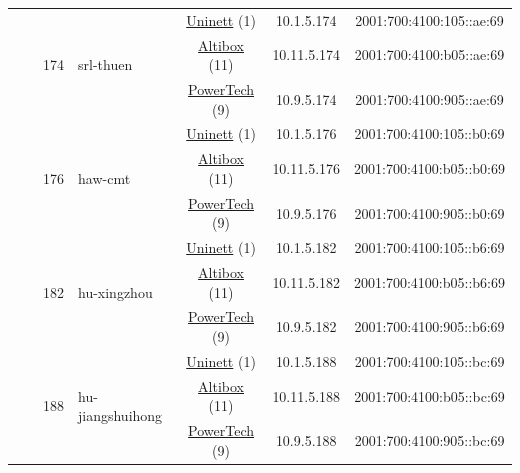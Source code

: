 \begin{small}
\begin{center}
\begin{longtable}{|c|c|c|c|c|c|c|c|}
  &  & \multirow{3}{*}{\tiny{174}} & \multicolumn{1}{|l|}{\multirow{3}{*}{\tiny{srl-thuen}}} & \multicolumn{2}{|c|}{\tiny{\href{https://www.uninett.no}{Uninett} (1)}} & \tiny{10.1.5.174} & \tiny{2001:700:4100:105::ae:69} \\* \cline{5-5}\cline{6-6}\cline{7-7}\cline{8-8}
  &  &  &  & \multicolumn{2}{|c|}{\tiny{\href{https://www.altibox.no}{Altibox} (11)}} & \tiny{10.11.5.174} & \tiny{2001:700:4100:b05::ae:69} \\* \cline{5-5}\cline{6-6}\cline{7-7}\cline{8-8}
  &  &  &  & \multicolumn{2}{|c|}{\tiny{\href{http://www.powertech.no}{PowerTech} (9)}} & \tiny{10.9.5.174} & \tiny{2001:700:4100:905::ae:69} \\* \cline{3-3}\cline{4-4}\cline{5-5}\cline{6-6}\cline{7-7}\cline{8-8}
  &  & \multirow{3}{*}{\tiny{176}} & \multicolumn{1}{|l|}{\multirow{3}{*}{\tiny{haw-cmt}}} & \multicolumn{2}{|c|}{\tiny{\href{https://www.uninett.no}{Uninett} (1)}} & \tiny{10.1.5.176} & \tiny{2001:700:4100:105::b0:69} \\* \cline{5-5}\cline{6-6}\cline{7-7}\cline{8-8}
  &  &  &  & \multicolumn{2}{|c|}{\tiny{\href{https://www.altibox.no}{Altibox} (11)}} & \tiny{10.11.5.176} & \tiny{2001:700:4100:b05::b0:69} \\* \cline{5-5}\cline{6-6}\cline{7-7}\cline{8-8}
  &  &  &  & \multicolumn{2}{|c|}{\tiny{\href{http://www.powertech.no}{PowerTech} (9)}} & \tiny{10.9.5.176} & \tiny{2001:700:4100:905::b0:69} \\* \cline{3-3}\cline{4-4}\cline{5-5}\cline{6-6}\cline{7-7}\cline{8-8}
  &  & \multirow{3}{*}{\tiny{182}} & \multicolumn{1}{|l|}{\multirow{3}{*}{\tiny{hu-xingzhou}}} & \multicolumn{2}{|c|}{\tiny{\href{https://www.uninett.no}{Uninett} (1)}} & \tiny{10.1.5.182} & \tiny{2001:700:4100:105::b6:69} \\* \cline{5-5}\cline{6-6}\cline{7-7}\cline{8-8}
  &  &  &  & \multicolumn{2}{|c|}{\tiny{\href{https://www.altibox.no}{Altibox} (11)}} & \tiny{10.11.5.182} & \tiny{2001:700:4100:b05::b6:69} \\* \cline{5-5}\cline{6-6}\cline{7-7}\cline{8-8}
  &  &  &  & \multicolumn{2}{|c|}{\tiny{\href{http://www.powertech.no}{PowerTech} (9)}} & \tiny{10.9.5.182} & \tiny{2001:700:4100:905::b6:69} \\* \cline{3-3}\cline{4-4}\cline{5-5}\cline{6-6}\cline{7-7}\cline{8-8}
  &  & \multirow{3}{*}{\tiny{188}} & \multicolumn{1}{|l|}{\multirow{3}{*}{\tiny{hu-jiangshuihong}}} & \multicolumn{2}{|c|}{\tiny{\href{https://www.uninett.no}{Uninett} (1)}} & \tiny{10.1.5.188} & \tiny{2001:700:4100:105::bc:69} \\* \cline{5-5}\cline{6-6}\cline{7-7}\cline{8-8}
  &  &  &  & \multicolumn{2}{|c|}{\tiny{\href{https://www.altibox.no}{Altibox} (11)}} & \tiny{10.11.5.188} & \tiny{2001:700:4100:b05::bc:69} \\* \cline{5-5}\cline{6-6}\cline{7-7}\cline{8-8}
  &  &  &  & \multicolumn{2}{|c|}{\tiny{\href{http://www.powertech.no}{PowerTech} (9)}} & \tiny{10.9.5.188} & \tiny{2001:700:4100:905::bc:69} \\ \hline
\end{longtable}
\end{center}
\end{small}
